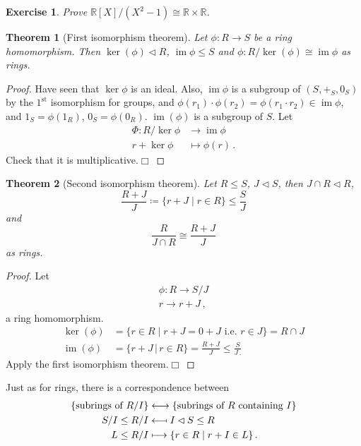 \documentclass{article}
\theoremstyle{plain}\theoremheaderfont{\normalfont\itshape}\theorembodyfont{\rmfamily}\theoremseparator{.}\newtheorem*{rem}{Remark}\newtheorem*{ex}{Example}\newtheorem*{proof}{Proof}\newtheorem*{altp}{Alternative proof}\newtheorem*{nonex}{Non-Example}
\theoremstyle{plain}\theoremheaderfont{\normalfont\bfseries}\theorembodyfont{\rmfamily}\theoremseparator{.}\newtheorem{thm}{Theorem}[section]\newtheorem{lem}[thm]{Lemma}\newtheorem{prop}[thm]{Proposition}\newtheorem*{cor}{Corollary}\newtheorem{defn}[thm]{Definition}\newtheorem{clm}[thm]{Claim}\newtheorem{clminproof}{Claim}\newtheorem*{notn}{Notation}\newtheorem*{exer}{Exercise}\newtheorem*{lemnn}{Lemma}
\theoremstyle{break}\theoremheaderfont{\normalfont\itshape}\theorembodyfont{\rmfamily}\theoremseparator{.\medskip}\newtheorem*{proofskip}{Proof}\newtheorem*{exs}{Examples}\newtheorem*{rems}{Remarks}\newtheorem*{obs}{Observations}
\theoremstyle{break}\theoremheaderfont{\normalfont\bfseries}\theorembodyfont{\rmfamily}\theoremseparator{.\medskip}\newtheorem{lemskip}[thm]{Lemma}\newtheorem{defnskip}[thm]{Definition}\newtheorem{propskip}[thm]{Proposition}\newtheorem{thmskip}[thm]{Theorem}
\numberwithin{equation}{section}
\newcommand{\qed}{\hfill\ensuremath{\Box}}
\DeclareMathOperator*{\im}{im}
\newcommand{\RR}{\mathbb{R}}
\newcommand{\longmappedfrom}{\;\reflectbox{\(\longmapsto\)}\;}
\begin{document}
    \begin{exer}
        Prove \(\RR[X]/(X^2-1)\cong\RR\times\RR\).
    \end{exer}
    \begin{thm}[First isomorphism theorem]
        Let \(\phi:R\to S\) be a ring homomorphism. Then \(\ker(\phi)\lhd R\), \(\im\phi\le S\) and \(\phi:R/\ker(\phi)\cong\im\phi\) as rings.
    \end{thm}
    \begin{proof}
        Have seen that \(\ker\phi\) is an ideal. Also, \(\im\phi\) is a subgroup of \((S,+_S,0_S)\) by the \(1^{\text{st}}\) isomorphism for groups, and \(\phi(r_1)\cdot\phi(r_2)=\phi(r_1\cdot r_2)\in\im\phi\), and \(1_S=\phi(1_R)\), \(0_S=\phi(0_R)\). \(\im(\phi)\) is a subgroup of \(S\). Let
        \begin{align*}
            \Phi:R/\ker\phi&\longrightarrow \im\phi\\
            r+\ker\phi&\longmapsto \phi(r)\,.
        \end{align*}
        Check that it is multiplicative.\qed
    \end{proof}
    \begin{thm}[Second isomorphism theorem]
        Let \(R\le S\), \(J\lhd S\), then \(J\cap R\lhd R\),
        \[\frac{R+J}{J}\coloneqq\{r+J\mid r\in R\}\le \frac{S}{J}\]
        and
        \[\frac{R}{J\cap R}\cong\frac{R+J}{J}\]
        as rings.
    \end{thm}
    \begin{proof}
        Let
        \begin{align*}
            \phi:R\longrightarrow S/J\\
            r\longrightarrow r+J\,,
        \end{align*}
        a ring homomorphism.
        \begin{align*}
            \ker(\phi)&=\{r\in R\mid r+J=0+J\text{ i.e. }r\in J\}=R\cap J\\
            \im(\phi)&=\{r+J\,|\,r\in R\}=\frac{R+J}{J}\le\frac{S}{J\,.}
        \end{align*}
        Apply the first isomorphism theorem.\qed
    \end{proof}
    Just as for rings, there is a correspondence between
    \begin{align*}
        \left\{\text{subrings of }R/I \right\}&\longleftrightarrow\left\{\text{subrings of } R \text{ containing }I\right\}\\
        S/I\le R/I&\longmappedfrom I\lhd S\le R\\
        L\le R/I&\longmapsto \{r\in R\mid r+I\in L\}\,.
    \end{align*}
\end{document}
